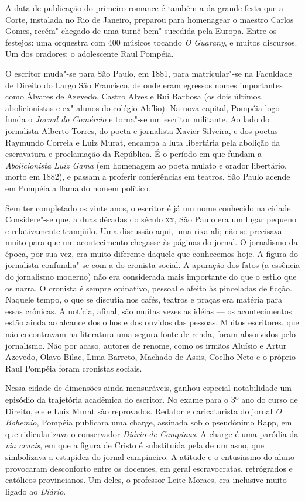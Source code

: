 A data de publicação do primeiro romance é também a da
grande festa que a Corte, instalada no Rio de Janeiro, preparou para
homenagear o maestro Carlos Gomes, recém"-chegado de uma turnê
bem"-sucedida pela Europa. Entre os festejos: uma orquestra com 400
músicos tocando \textit{O Guarany}, e muitos
discursos. Um dos oradores: o adolescente Raul Pompéia.

O escritor muda"-se para São Paulo, em 1881, para
matricular"-se na Faculdade de Direito do Largo São Francisco, de onde
eram egressos nomes importantes como Álvares de Azevedo, Castro Alves e
Rui Barbosa (os dois últimos, abolicionistas e ex"-alunos do colégio
Abílio). Na nova capital, Pompéia logo funda o \textit{Jornal
 do Comércio} e torna"-se um escritor militante. Ao
lado do jornalista Alberto Torres, do poeta e jornalista Xavier
Silveira, e dos poetas Raymundo Correia e Luiz Murat, encampa a luta
libertária pela abolição da escravatura e proclamação da República. É o
período em que fundam a \textit{Abolicionista Luiz
Gama} (em homenagem ao poeta mulato e orador
libertário, morto em 1882), e passam a proferir conferências em
teatros. São Paulo acende em Pompéia a flama do homem político.

Sem ter completado os vinte anos, o escritor é já um nome conhecido na
cidade. Considere"-se que, a duas décadas do século \textsc{xx}, São Paulo era
um lugar pequeno e relativamente tranqüilo. Uma discussão aqui, uma
rixa ali; não se precisava muito para que um acontecimento chegasse às
páginas do jornal. O jornalismo da época, por sua vez, era muito
diferente daquele que conhecemos hoje. A figura do jornalista
confundia"-se com a do cronista social. A apuração dos fatos (a
essência do jornalismo moderno) não era considerada mais importante do
que o estilo que os narra. O cronista é sempre opinativo, pessoal e
afeito às pinceladas de ficção. Naquele tempo, o que se discutia nos
cafés, teatros e praças era matéria para essas crônicas. A notícia,
afinal, são muitas vezes as idéias --- os acontecimentos estão ainda ao
alcance dos olhos e dos ouvidos das pessoas. Muitos escritores, que não
encontravam na literatura uma segura fonte de renda, foram absorvidos
pelo jornalismo. Não por acaso, autores de renome, como os irmãos
Aluísio e Artur Azevedo, Olavo Bilac, Lima Barreto, Machado de Assis,
Coelho Neto e o próprio Raul Pompéia foram cronistas sociais.


Nessa cidade de dimensões ainda mensuráveis, ganhou
especial notabilidade um episódio da trajetória acadêmica do escritor.
No exame para o 3º ano do curso
de Direito, ele e Luiz Murat são reprovados. Redator e caricaturista do
jornal \textit{O Bohemio}, Pompéia publicara
uma charge, assinada sob o pseudônimo Rapp, em que ridicularizava o
conservador \textit{Diário de Campinas}. A
charge é uma paródia da \textit{via crucis},
em que a figura de Cristo é substituída pela de um asno, que
simbolizava a estupidez do jornal campineiro. A atitude e o entusiasmo
do aluno provocaram desconforto entre os docentes, em geral
escravocratas, retrógrados e católicos provincianos. Um deles, o
professor Leite Moraes, era inclusive muito ligado ao
\textit{Diário}.


